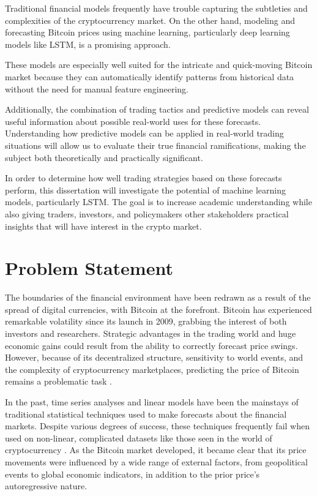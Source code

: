 Traditional financial models frequently have trouble capturing the subtleties and complexities of the cryptocurrency market. On the other hand, modeling and forecasting Bitcoin prices using machine learning, particularly deep learning models like LSTM, is a promising approach. 

These models are especially well suited for the intricate and quick-moving Bitcoin market because they can automatically identify patterns from historical data without the need for manual feature engineering.

Additionally, the combination of trading tactics and predictive models can reveal useful information about possible real-world uses for these forecasts. Understanding how predictive models can be applied in real-world trading situations will allow us to evaluate their true financial ramifications, making the subject both theoretically and practically significant.

In order to determine how well trading strategies based on these forecasts perform, this dissertation will investigate the potential of machine learning models, particularly LSTM. The goal is to increase academic understanding while also giving traders, investors, and policymakers other stakeholders practical insights that will have interest in the crypto market.

\goodbreak
\section{Problem Statement}
The boundaries of the financial environment have been redrawn as a result of the spread of digital currencies, with Bitcoin at the forefront. Bitcoin has experienced remarkable volatility since its launch in 2009, grabbing the interest of both investors and researchers. Strategic advantages in the trading world and huge economic gains could result from the ability to correctly forecast price swings. However, because of its decentralized structure, sensitivity to world events, and the complexity of cryptocurrency marketplaces, predicting the price of Bitcoin remains a problematic task \citep{article}.

\smallskip

In the past, time series analyses and linear models have been the mainstays of traditional statistical techniques used to make forecasts about the financial markets. Despite various degrees of success, these techniques frequently fail when used on non-linear, complicated datasets like those seen in the world of cryptocurrency \citep{smith2016predictive}. As the Bitcoin market developed, it became clear that its price movements were influenced by a wide range of external factors, from geopolitical events to global economic indicators, in addition to the prior price's autoregressive nature.

